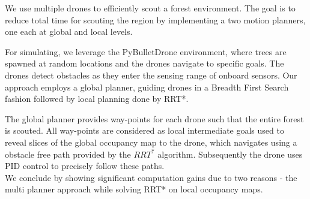 We use multiple drones to efficiently scout a forest environment. The goal is to reduce 
total time for scouting the region by implementing a two motion planners, one each at 
global and local levels.

For simulating, we leverage the PyBulletDrone\cite{panerati2021learning} environment, 
where trees are spawned at random locations and the drones navigate to specific goals. 
The drones detect obstacles as they enter the sensing range of onboard sensors. 
Our approach employs a global planner, guiding drones in a Breadth First Search fashion 
followed by local planning done by RRT*. 

The global planner provides way-points for each drone such that the entire forest is scouted. 
All way-points are considered as local intermediate goals used to reveal slices of the 
global occupancy map to the drone, which navigates using a obstacle free path provided by the 
\(RRT^*\) algorithm. Subsequently the drone uses PID control to precisely follow these paths.\\

We conclude by showing significant computation gains due to two reasons - the multi planner 
approach while solving RRT* on local occupancy maps.